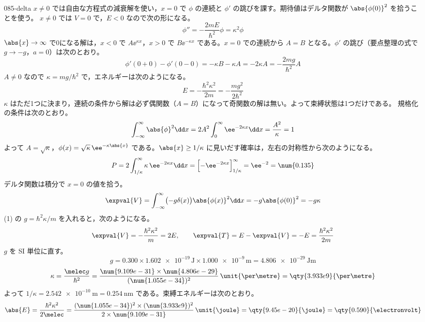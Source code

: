 \documentclass[uplatex,dvipdfmx,a4paper,11pt]{jsarticle}
\begin{document}
\begin{kaisetsu}{085-delta}
\houshin $x\ne 0$ では自由な方程式の減衰解を使い，$x=0$ で $\phi$ の連続と $\phi'$ の跳びを課す。期待値はデルタ関数が $\abs{\phi(0)}^{2}$ を拾うことを使う。
\keisan
{} $x\ne 0$ では $V=0$ で，$E<0$ なので次の形になる。
\[ \phi''=-\frac{2mE}{\hbar^{2}}\phi=\kappa^{2}\phi \]
$\abs{x}\to\infty$ で0になる解は，$x<0$ で $A\ee^{\kappa x}$，$x>0$ で $B\ee^{-\kappa x}$ である。$x=0$ での連続から $A=B$ となる。$\phi'$ の跳び（要点整理の式で $g\to-g$，$a=0$）は次のとおり。
\[ \phi'(0+0)-\phi'(0-0)=-\kappa B-\kappa A=-2\kappa A=-\frac{2mg}{\hbar^{2}}A \]
$A\ne 0$ なので $\kappa=mg/\hbar^{2}$ で，エネルギーは次のようになる。
\[ E=-\frac{\hbar^{2}\kappa^{2}}{2m}=-\frac{mg^{2}}{2\hbar^{2}} \]
$\kappa$ はただ1つに決まり，連続の条件から解は必ず偶関数（$A=B$）になって奇関数の解は無い。よって束縛状態は1つだけである。
 規格化の条件は次のとおり。
\[ \int_{-\infty}^{\infty}\abs{\phi}^{2}\dd x=2A^{2}\int_{0}^{\infty}\ee^{-2\kappa x}\dd x=\frac{A^{2}}{\kappa}=1 \]
よって $A=\sqrt{\kappa}$，$\phi(x)=\sqrt{\kappa}\,\ee^{-\kappa\abs{x}}$ である。$\abs{x}\ge 1/\kappa$ に見いだす確率は，左右の対称性から次のようになる。
\[ P=2\int_{1/\kappa}^{\infty}\kappa\,\ee^{-2\kappa x}\dd x=\Bigl[-\ee^{-2\kappa x}\Bigr]_{1/\kappa}^{\infty}=\ee^{-2}=\num{0.135} \]
 デルタ関数は積分で $x=0$ の値を拾う。
\[ \expval{V}=\int_{-\infty}^{\infty}\bigl(-g\delta(x)\bigr)\abs{\phi(x)}^{2}\dd x=-g\abs{\phi(0)}^{2}=-g\kappa \]
(1) の $g=\hbar^{2}\kappa/m$ を入れると，次のようになる。
\[ \expval{V}=-\frac{\hbar^{2}\kappa^{2}}{m}=2E,\qquad \expval{T}=E-\expval{V}=-E=\frac{\hbar^{2}\kappa^{2}}{2m} \]
 $g$ を SI 単位に直す。
\[ g=\num{0.300}\times\num{1.602e-19}\,\unit{\joule}\times\num{1.000e-9}\,\unit{\metre}=\qty{4.806e-29}{\joule\metre} \]
\[ \kappa=\frac{\melec g}{\hbar^{2}}=\frac{\num{9.109e-31}\times\num{4.806e-29}}{(\num{1.055e-34})^{2}}\,\unit{\per\metre}=\qty{3.933e9}{\per\metre} \]
よって $1/\kappa=\qty{2.542e-10}{\metre}=\qty{0.254}{\nano\metre}$ である。束縛エネルギーは次のとおり。
\[ \abs{E}=\frac{\hbar^{2}\kappa^{2}}{2\melec}=\frac{(\num{1.055e-34})^{2}\times(\num{3.933e9})^{2}}{2\times\num{9.109e-31}}\,\unit{\joule}=\qty{9.45e-20}{\joule}=\qty{0.590}{\electronvolt} \]

\end{kaisetsu}
\end{document}
